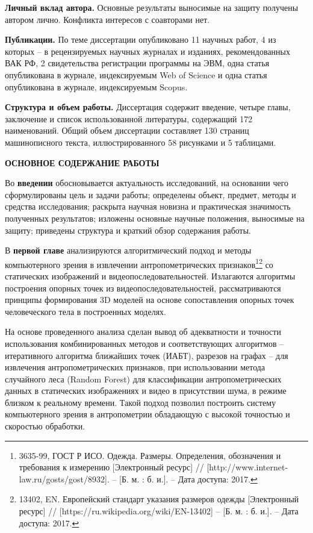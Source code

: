 \textbf{Личный вклад автора.} Основные результаты выносимые на защиту получены автором лично. Конфликта интересов с соавторами нет.

\textbf{Публикации.} По теме диссертации опубликовано 11 научных работ, 4 из которых – в рецензируемых научных журналах и изданиях, рекомендованных ВАК РФ, 2 свидетельства регистрации программы на ЭВМ, одна статья опубликована в журнале, индексируемым Web of Science и одна статья опубликована в журнале, индексируемым Scopus.

\textbf{Структура и объем работы.} Диссертация содержит введение, четыре главы, заключение и список использованной литературы, содержащий 172 наименований. Общий объем диссертации составляет 130 страниц машинописного текста, иллюстрированного 58 рисунками и 5 таблицами.
\begin{center}
\textbf{ОСНОВНОЕ СОДЕРЖАНИЕ РАБОТЫ}
\end{center}

Во \textbf{введении} обосновывается актуальность исследований, на основании чего сформулированы цель и задачи работы; определены объект, предмет, методы и средства исследования; раскрыта научная новизна и практическая значимость полученных результатов; изложены основные научные положения, выносимые на защиту; приведены структура и краткий обзор содержания работы.

В \textbf {первой главе} анализируются алгоритмический подход и методы компьютерного зрения в извлечении антропометрических признаков\footnote{3635-99, ГОСТ Р ИСО. Одежда. Размеры. Определения, обозначения и требования к измерению [Электронный ресурс] // [http://www.internet-law.ru/gosts/gost/8932]. -- [Б. м. : б. и.]. -- Дата доступа: 2017.}\footnote{13402, EN. Европейский стандарт указания размеров одежды [Электронный ресурс] // [https://ru.wikipedia.org/wiki/EN-13402] -- [Б. м. : б. и.]. -- Дата доступа: 2017.} со статических изображений и видеопоследовательностей. Излагаются алгоритмы построения опорных точек из видеопоследовательностей, рассматриваются принципы формирования 3D моделей на основе сопоставления опорных точек человеческого тела в построенных моделях.

На основе проведенного анализа сделан вывод об адекватности и точности использования комбинированных методов и соответствующих алгоритмов -- итеративного алгоритма ближайших точек (ИАБТ), разрезов на графах -- для извлечения антропометрических признаков, при использовании метода случайного леса (Random Forest) для классификации антропометрических данных в статических изображениях и видео в присутствии шума, в режиме близком к реальному времени. Такой подход позволил построить систему компьютерного зрения в антропометрии обладающую с высокой точностью и скоростью обработки.

